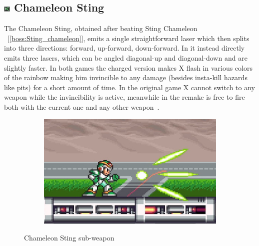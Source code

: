 \subsection{\includegraphics[width=12px, height=10px]{figures/X1/weapons/C_sting.jpg} Chameleon Sting}\label{Chameleon_sting}
The Chameleon Sting, obtained after beating Sting Chameleon ~[\ref{boss:Sting_chameleon}], emits a single straightforward laser which then splits into three directions: forward, up-forward, down-forward. In \mhx it instead directly emits three lasers, which can be angled diagonal-up and diagonal-down and are slightly faster. In both games the charged version makes X flash in various colors of the rainbow making him invincible to any damage (besides insta-kill hazards like pits) for a short amount of time. In the original game X cannot switch to any weapon while the invincibility is active, meanwhile in the remake is free to fire both with the current one and any other weapon~\cite{wiki:Chameleon_sting}.
\begin{figure}[htp]
	\centering
	\begin{subfigure}{0.35\linewidth}
		\includegraphics[width=\linewidth]{figures/X1/weapons/Chameleon_sting.jpg}
	\end{subfigure}
	\caption{Chameleon Sting sub-weapon}
\end{figure}

